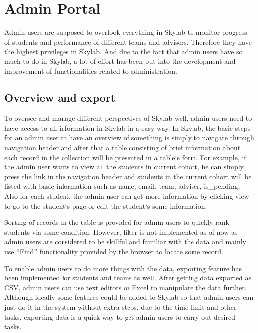\chapter{Admin Portal} \label{adminportal}

Admin users are supposed to overlook everything in Skylab to monitor progress of students and performance of different teams and advisers. Therefore they have the highest privileges in Skylab. And due to the fact that admin users have so much to do in Skylab, a lot of effort has been put into the development and improvement of functionalities related to administration.

\section{Overview and export} \label{adminoverview}

To oversee and manage different perspectives of Skylab well, admin users need to have access to all information in Skylab in a easy way. In Skylab, the basic steps for an admin user to have an overview of something is simply to navigate through navigation header and after that a table consisting of brief information about each record in the collection will be presented in a table`s form. For example, if the admin user wants to view all the students in current cohort, he can simply press the link in the navigation header and students in the current cohort will be listed with basic information such as name, email, team, adviser, is\_pending. Also for each student, the admin user can get more information by clicking view to go to the student`s page or edit the student`s some information.

Sorting of records in the table is provided for admin users to quickly rank students via some condition. However, filter is not implemented as of now as admin users are considered to be skillful and familiar with the data and mainly use ``Find'' functionality provided by the browser to locate some record.

To enable admin users to do more things with the data, exporting feature has been implemented for students and teams as well. After getting data exported as CSV, admin users can use text editors or Excel to manipulate the data further. Although ideally some features could be added to Skylab so that admin users can just do it in the system without extra steps, due to the time limit and other tasks, exporting data is a quick way to get admin users to carry out desired tasks.

